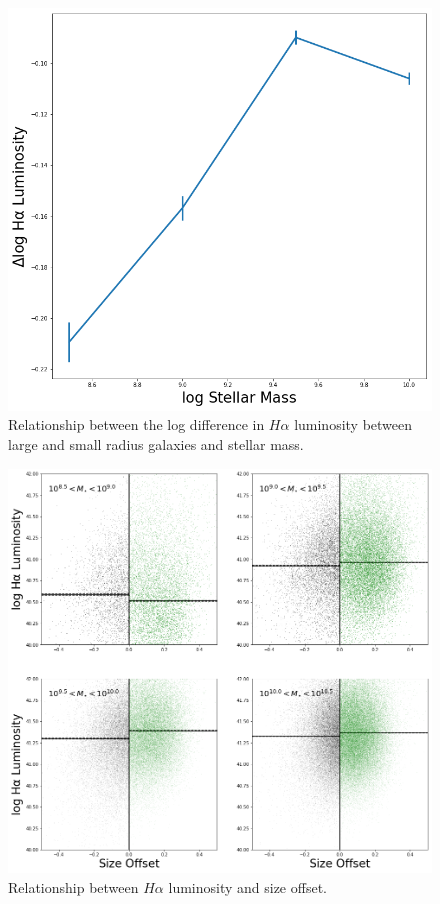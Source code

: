 \documentclass[iop]{emulateapj}
\begin{document}
\begin{figure}
	\centering
	\includegraphics[width= \columnwidth]{ratios_ha_ew.png}
	\caption{Relationship between the log difference in $H\alpha$ luminosity between large and small radius galaxies and stellar mass. }
	\label{fig:HA_ew_mass}
	
\end{figure}


\begin{figure}
	\centering
	\includegraphics[width=1.5 \columnwidth]{ha_lum_2x2.png}
	\caption{Relationship between $H\alpha$ luminosity and size offset. }
     \label{fig:HA_lum}

\end{figure}
\end{document}
